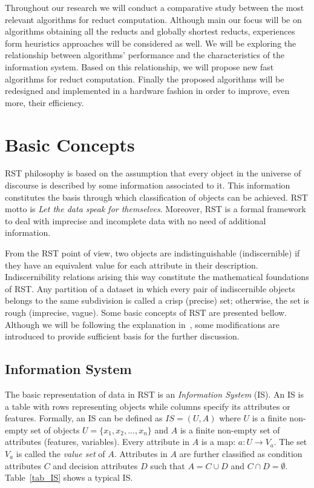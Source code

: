 \documentclass[authoryear,11pt]{elsarticle}
\begin{document}
  Throughout our research we will conduct a comparative study between the most relevant algorithms for reduct 
  computation. Although main our focus will be on algorithms obtaining all the reducts and globally shortest reducts,
  experiences form heuristics approaches will be considered as well. We will be exploring the relationship 
  between algorithms' performance and the characteristics of the information system. Based on this relationship,
  we will propose new fast algorithms for reduct computation. Finally the proposed algorithms 
  will be redesigned and implemented in a hardware fashion in order to improve, even more, their efficiency.  

\section{Basic Concepts}\label{basicConcepts}
  RST philosophy is based on the assumption that every object in the universe of discourse is described by 
  some information associated to it. This information constitutes the basis through which classification of 
  objects can be achieved. RST motto is \textit{Let the data speak for themselves}. Moreover, RST is a formal 
  framework to deal with imprecise and incomplete data with no need of additional information.
  
  From the RST point of view, two objects are indistinguishable (indiscernible) if they have an equivalent 
  value for each attribute in their description. Indiscernibility relations arising this way constitute the
  mathematical foundations of RST. Any partition of a dataset in which every pair of indiscernible objects
  belongs to the same subdivision is called a crisp (precise) set; otherwise, the set is rough (imprecise, 
  vague). Some basic concepts of RST are presented bellow. Although we will be following the explanation 
  in~\citep{Polkowski00}, some modifications are introduced to provide sufficient basis for the further 
  discussion.
  
\subsection{Information System}
  The basic representation of data in RST is an \emph{Information System} (IS). An IS is a table with rows
  representing objects while columns specify its attributes or features. Formally, an IS can be defined as 
  $IS=(U,A)$ where $U$ is a finite non-empty set of objects $U=\lbrace x_1,x_2,...,x_n\rbrace$ and $A$ is a 
  finite non-empty set
  of attributes (features, variables). Every attribute in $A$ is a map: $a: U \rightarrow V_a$. The set $V_a$ is
  called the \textit{value set} of $A$. Attributes in $A$ are further classified as condition attributes $C$ and 
  decision attributes $D$ such that $A=C \cup D$ and $C \cap D =\emptyset$. 
  Table~\ref{tab_IS} shows a typical IS.
  
\end{document}

